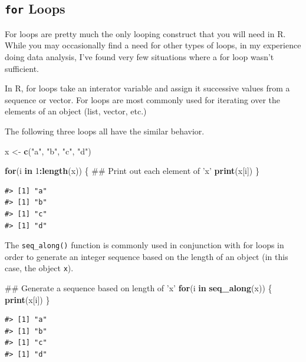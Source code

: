 \documentclass[]{book}
\newenvironment{Shaded}{\begin{snugshade}}{\end{snugshade}}
\newcommand{\KeywordTok}[1]{\textcolor[rgb]{0.13,0.29,0.53}{\textbf{#1}}}
\newcommand{\DecValTok}[1]{\textcolor[rgb]{0.00,0.00,0.81}{#1}}
\newcommand{\StringTok}[1]{\textcolor[rgb]{0.31,0.60,0.02}{#1}}
\newcommand{\ControlFlowTok}[1]{\textcolor[rgb]{0.13,0.29,0.53}{\textbf{#1}}}
\newcommand{\OperatorTok}[1]{\textcolor[rgb]{0.81,0.36,0.00}{\textbf{#1}}}
\newcommand{\NormalTok}[1]{#1}
\theoremstyle{definition}
\theoremstyle{definition}
\theoremstyle{definition}
\theoremstyle{remark}
\begin{document}
\subsection{\texorpdfstring{\texttt{for}
Loops}{for Loops}}\label{for-loops}

For loops are pretty much the only looping construct that you will need
in R. While you may occasionally find a need for other types of loops,
in my experience doing data analysis, I've found very few situations
where a for loop wasn't sufficient.

In R, for loops take an interator variable and assign it successive
values from a sequence or vector. For loops are most commonly used for
iterating over the elements of an object (list, vector, etc.)

The following three loops all have the similar behavior.

\begin{Shaded}
\begin{Highlighting}[]
\NormalTok{x <-}\StringTok{ }\KeywordTok{c}\NormalTok{(}\StringTok{"a"}\NormalTok{, }\StringTok{"b"}\NormalTok{, }\StringTok{"c"}\NormalTok{, }\StringTok{"d"}\NormalTok{)}

\ControlFlowTok{for}\NormalTok{(i }\ControlFlowTok{in} \DecValTok{1}\OperatorTok{:}\KeywordTok{length}\NormalTok{(x)) \{}
\NormalTok{        ## Print out each element of 'x'}
        \KeywordTok{print}\NormalTok{(x[i])  }
\NormalTok{\}}
\end{Highlighting}
\end{Shaded}

\begin{verbatim}
#> [1] "a"
#> [1] "b"
#> [1] "c"
#> [1] "d"
\end{verbatim}

The \texttt{seq\_along()} function is commonly used in conjunction with
for loops in order to generate an integer sequence based on the length
of an object (in this case, the object \texttt{x}).

\begin{Shaded}
\begin{Highlighting}[]
\NormalTok{## Generate a sequence based on length of 'x'}
\ControlFlowTok{for}\NormalTok{(i }\ControlFlowTok{in} \KeywordTok{seq_along}\NormalTok{(x)) \{   }
        \KeywordTok{print}\NormalTok{(x[i])}
\NormalTok{\}}
\end{Highlighting}
\end{Shaded}

\begin{verbatim}
#> [1] "a"
#> [1] "b"
#> [1] "c"
#> [1] "d"
\end{verbatim}
\end{document}
